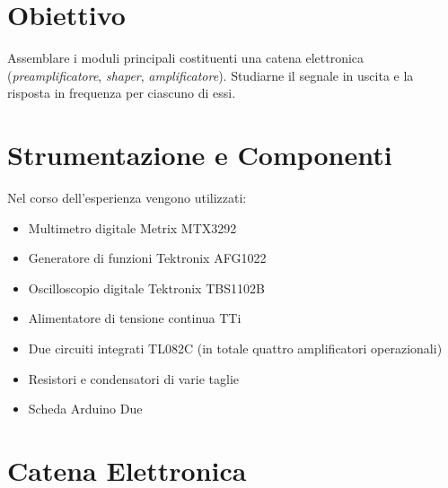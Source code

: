 \documentclass[a4paper,11pt]{article} %
\begin{document}
\section{Obiettivo}

Assemblare i moduli principali costituenti una catena elettronica (\textit{preamplificatore}, \textit{shaper},
\textit{amplificatore}). Studiarne il segnale in uscita e la risposta in frequenza per ciascuno di essi.


\section{Strumentazione e Componenti}\label{s:strumenti}

Nel corso dell'esperienza vengono utilizzati:
\begin{itemize}[itemsep=-0.5ex]
	\item Multimetro digitale Metrix MTX3292
	\item Generatore di funzioni Tektronix AFG1022
	\item Oscilloscopio digitale Tektronix TBS1102B
	\item Alimentatore di tensione continua TTi
	\item Due circuiti integrati TL082C (in totale quattro amplificatori operazionali)
	\item Resistori e condensatori di varie taglie
	\item Scheda Arduino Due
\end{itemize}


\section{Catena Elettronica}\label{s:catel}
\end{document}
